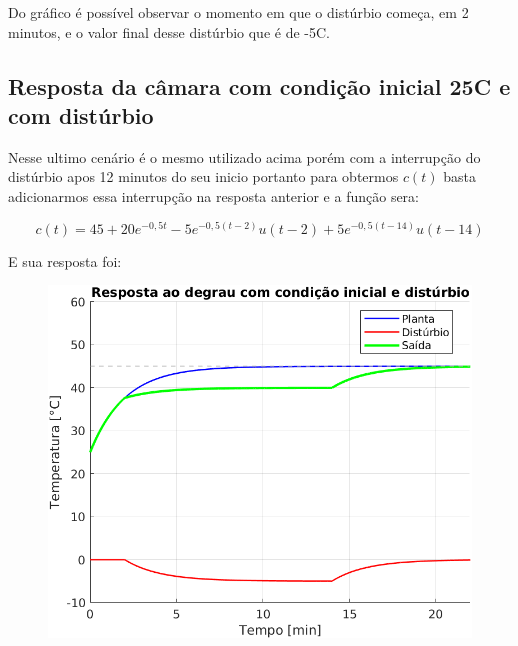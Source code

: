\documentclass[a4paper,12pt]{article}
\begin{document}
		Do gráfico é possível observar o momento em que o distúrbio começa, em 2 minutos, e o valor final desse distúrbio que é de -5\degree C.
		
	\subsection{Resposta da câmara com condição inicial 25\degree C e com distúrbio}
		Nesse ultimo cenário é o mesmo utilizado acima porém com a interrupção do distúrbio apos 12 minutos do seu inicio portanto para obtermos $c(t)$ basta adicionarmos essa interrupção na resposta anterior e a função sera:
		
		\begin{equation}
			c(t) = 45 + 20e^{-0,5t} - 5e^{-0,5(t-2)}u(t-2) + 5e^{-0,5(t-14)}u(t-14)
		\end{equation}
	
		E sua resposta foi:
		
		\begin{figure}[H]
			\centering
			\includegraphics[width=0.5\linewidth]{images/respe.png}
			\label{fig:resposta_e}
		\end{figure}
		
		
		
		
		
		
		
		
	
	
\end{document}
